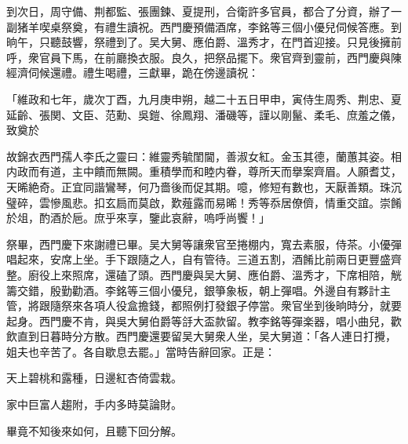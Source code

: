 到次日，周守備、荆都監、張團鍊、夏提刑，合衛許多官員，都合了分資，辦了一副猪羊喫桌祭奠，有禮生讀祝。西門慶預備酒席，李銘等三個小優兒伺候答應。到晌午，只聽鼓響，祭禮到了。吴大舅、應伯爵、溫秀才，在門首迎接。只見後擁前呼，衆官員下馬，在前廳換衣服。良久，把祭品擺下。衆官齊到靈前，西門慶與陳經濟伺候還禮。禮生喝禮，三獻畢，跪在傍邊讀祝：

\begin{myquote}
「維政和七年，歲次丁酉，九月庚申朔，越二十五日甲申，寅侍生周秀、荆忠、夏延齡、張関、文臣、范勳、吳鎧、徐鳳翔、潘磯等，謹以剛鬣、柔毛、庶羞之儀，致奠於

故錦衣西門孺人李氏之靈曰：維靈秀毓閨閫，善淑女紅。金玉其德，蘭蕙其姿。相内政而有道，主中饋而無闕。重積學而和睦内眷，尊所天而擧案齊眉。人願耆艾，天晞絶奇。正宜同諧鸞琴，何乃嗇後而促其期。噫，修短有數也，天厭善類。珠沉璧碎，雲慘風悲。扣玄扃而莫啟，歎薤露而易晞！秀等忝居僚儕，情重交誼。崇餚於俎，酌酒於巵。庶乎來享，鑒此哀辭，嗚呼尚饗！」
\end{myquote}

祭畢，西門慶下來謝禮已畢。吴大舅等讓衆官至捲棚内，寬去素服，侍茶。小優彈唱起來，安席上坐。手下跟隨之人，自有管待。三道五割，酒餚比前兩日更豐盛齊整。廚役上來照席，還磕了頭。西門慶與吴大舅、應伯爵、溫秀才，下席相陪，觥籌交錯，殷勤勸酒。李銘等三個小優兒，銀箏象板，朝上彈唱。外邊自有夥計主管，將跟隨祭來各項人役盒擔錢，都照例打發銀子停當。衆官坐到後晌時分，就要起身。西門慶不肯，與吳大舅伯爵等㧱大盃款留。教李銘等彈楽器，唱小曲兒，歡飲直到日暮時分方散。西門慶還要留吴大舅衆人坐，吴大舅道：「各人連日打攪，姐夫也辛苦了。各自歇息去罷。」當時告辭回家。正是：

\begin{myquote}
天上碧桃和露種，日邊紅杏倚雲栽。

家中巨富人趨附，手内多時莫論財。
\end{myquote}

畢竟不知後來如何，且聽下回分解。


